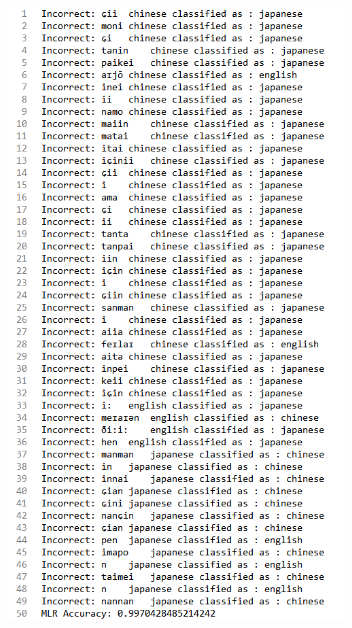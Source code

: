 \documentclass[a4paper]{article}
\begin{document}
\begin{figure}[H]
\centering
\includegraphics[width=3.5in]{mlrresult.png}
\end{figure}
\end{document}

